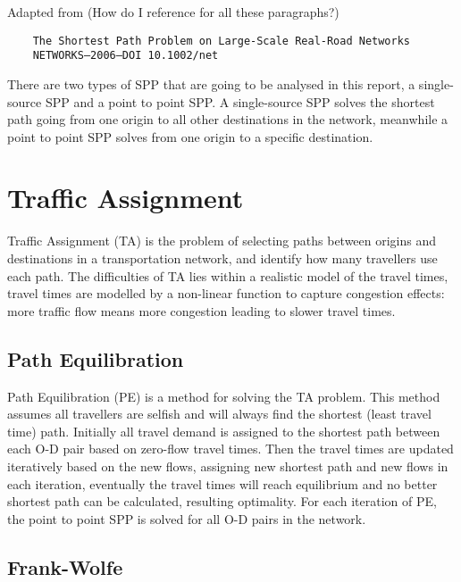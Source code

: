 {
    Adapted from (How do I reference for all these paragraphs?)
    \begin{verbatim}
    The Shortest Path Problem on Large-Scale Real-Road Networks
    NETWORKS—2006—DOI 10.1002/net
    \end{verbatim}
}
There are two types of SPP that are going to
be analysed in this report,
a single-source SPP and a point to point SPP.
A single-source SPP solves the shortest path going from one origin to all other destinations in the network,
meanwhile a point to point SPP solves from one origin to a specific destination.

\section{Traffic Assignment}
Traffic Assignment (TA) is the problem of selecting paths between origins and destinations in a transportation network,
and identify how many travellers use each path.
The difficulties of TA lies within a realistic model of the travel times,
travel times are modelled by a non-linear function to capture congestion effects:
more traffic flow means more congestion leading to slower travel times.

\subsection{Path Equilibration}
Path Equilibration (PE) is a method for solving the TA problem.
This method assumes all travellers are selfish and will always find the shortest (least travel time) path.
Initially all travel demand is assigned to the shortest path between each O-D pair based on zero-flow travel times.
Then the travel times are updated iteratively based on the new flows, 
assigning new shortest path and new flows in each iteration,
eventually the travel times will reach equilibrium and no better shortest path can be calculated,
resulting optimality.
For each iteration of PE,
the point to point SPP is solved for all O-D pairs in the network.


\subsection{Frank-Wolfe}

